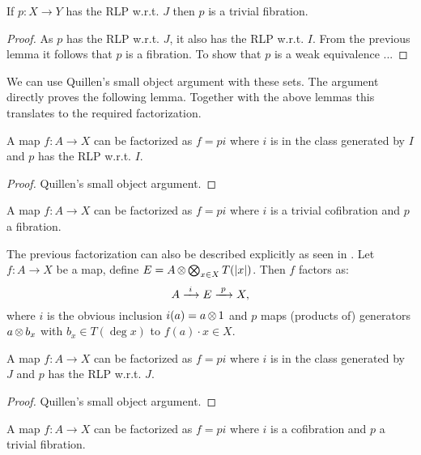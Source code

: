 \begin{lemma}
	If $p: X \to Y$ has the RLP w.r.t. $J$ then $p$ is a trivial fibration.
\end{lemma}
\begin{proof}
	As $p$ has the RLP w.r.t. $J$, it also has the RLP w.r.t. $I$. From the previous lemma it follows that $p$ is a fibration. To show that $p$ is a weak equivalence ... 
\end{proof}

We can use Quillen's small object argument with these sets. The argument directly proves the following lemma. Together with the above lemmas this translates to the required factorization.

\begin{lemma}
	A map $f: A \to X$ can be factorized as $f = pi$ where $i$ is in the class generated by $I$ and $p$ has the RLP w.r.t. $I$.
\end{lemma}
\begin{proof}
	Quillen's small object argument. 
\end{proof}

\begin{corollary}
	[MC5a] A map $f: A \to X$ can be factorized as $f = pi$ where $i$ is a trivial cofibration and $p$ a fibration.
\end{corollary}

The previous factorization can also be described explicitly as seen in \cite{bous}. Let $f: A \to X$ be a map, define $E = A \operatorname*{\otimes} \operatorname*{\bigotimes}_{x \in X}T({|{x}|})$. Then $f$ factors as:
$$ A \xrightarrow{\,\,{i}\,\,} E \xrightarrow{\,\,{p}\,\,} X, $$
where $i$ is the obvious inclusion $i(a) = a \operatorname*{\otimes} 1$ and $p$ maps (products of) generators $a \operatorname*{\otimes} b_x$ with $b_x \in T(\deg{x})$ to $f(a) \cdot x \in X$.

\begin{lemma}
	A map $f: A \to X$ can be factorized as $f = pi$ where $i$ is in the class generated by $J$ and $p$ has the RLP w.r.t. $J$.
\end{lemma}
\begin{proof}
	Quillen's small object argument.
\end{proof}

\begin{corollary}
	[MC5b] A map $f: A \to X$ can be factorized as $f = pi$ where $i$ is a cofibration and $p$ a trivial fibration.
\end{corollary}



